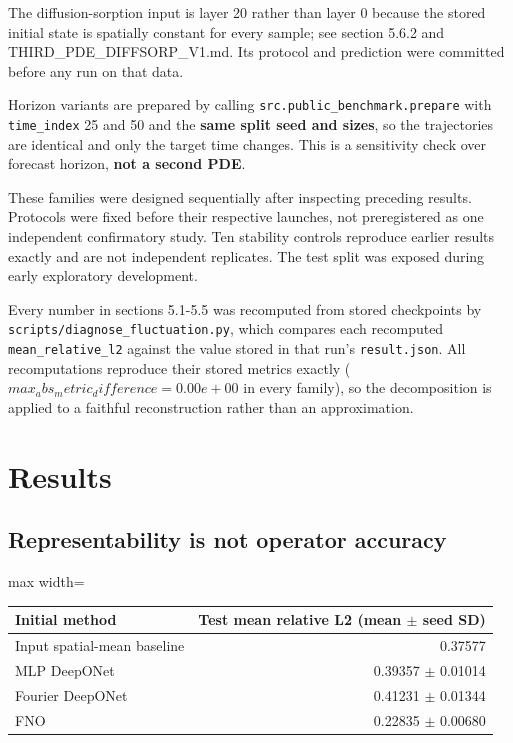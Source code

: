 \documentclass[preprint,12pt]{elsarticle}
\begin{document}
The diffusion-sorption input is layer 20 rather than layer 0 because the stored initial state is spatially constant for every sample; see section 5.6.2 and THIRD\_PDE\_DIFFSORP\_V1.md. Its protocol and prediction were committed before any run on that data.

Horizon variants are prepared by calling \texttt{src.public\_benchmark.prepare} with \texttt{time\_index} 25 and 50 and the \textbf{same split seed and sizes}, so the trajectories are identical and only the target time changes. This is a sensitivity check over forecast horizon, \textbf{not a second PDE}.

These families were designed sequentially after inspecting preceding results. Protocols were fixed before their respective launches, not preregistered as one independent confirmatory study. Ten stability controls reproduce earlier results exactly and are not independent replicates. The test split was exposed during early exploratory development.

Every number in sections 5.1-5.5 was recomputed from stored checkpoints by \texttt{scripts/diagnose\_fluctuation.py}, which compares each recomputed \texttt{mean\_relative\_l2} against the value stored in that run's \texttt{result.json}. All recomputations reproduce their stored metrics exactly ($max_abs_metric_difference = 0.00e+00$ in every family), so the decomposition is applied to a faithful reconstruction rather than an approximation.

\section{Results}

\subsection{Representability is not operator accuracy}

\begin{center}
\begin{adjustbox}{max width=\linewidth}
\small
\begin{tabular}{lr}
\toprule
Initial method & Test mean relative L2 (mean $\pm$ seed SD) \\
\midrule
Input spatial-mean baseline & 0.37577 \\
MLP DeepONet & 0.39357 $\pm$ 0.01014 \\
Fourier DeepONet & 0.41231 $\pm$ 0.01344 \\
FNO & 0.22835 $\pm$ 0.00680 \\
\bottomrule
\end{tabular}
\end{adjustbox}
\end{center}
\end{document}
